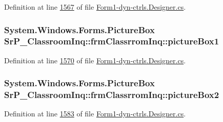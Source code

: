 \-Definition at line \hyperlink{_form1-dyn-ctrls_8_designer_8cs_source_l01567}{1567} of file \hyperlink{_form1-dyn-ctrls_8_designer_8cs_source}{\-Form1-\/dyn-\/ctrls.\-Designer.\-cs}.

\hypertarget{class_sr_p___classroom_inq_1_1frm_classrrom_inq_ab971146df86e1277868bef4199a7b8f4}{
\subsubsection[{picture\-Box1}]{\setlength{\rightskip}{0pt plus 5cm}\-System.\-Windows.\-Forms.\-Picture\-Box {\bf \-Sr\-P\-\_\-\-Classroom\-Inq\-::frm\-Classrrom\-Inq\-::picture\-Box1}}}
\label{class_sr_p___classroom_inq_1_1frm_classrrom_inq_ab971146df86e1277868bef4199a7b8f4}


\-Definition at line \hyperlink{_form1-dyn-ctrls_8_designer_8cs_source_l01570}{1570} of file \hyperlink{_form1-dyn-ctrls_8_designer_8cs_source}{\-Form1-\/dyn-\/ctrls.\-Designer.\-cs}.

\hypertarget{class_sr_p___classroom_inq_1_1frm_classrrom_inq_aeb268a5866f810521414bd3fd047ca72}{
\subsubsection[{picture\-Box2}]{\setlength{\rightskip}{0pt plus 5cm}\-System.\-Windows.\-Forms.\-Picture\-Box {\bf \-Sr\-P\-\_\-\-Classroom\-Inq\-::frm\-Classrrom\-Inq\-::picture\-Box2}}}
\label{class_sr_p___classroom_inq_1_1frm_classrrom_inq_aeb268a5866f810521414bd3fd047ca72}


\-Definition at line \hyperlink{_form1-dyn-ctrls_8_designer_8cs_source_l01583}{1583} of file \hyperlink{_form1-dyn-ctrls_8_designer_8cs_source}{\-Form1-\/dyn-\/ctrls.\-Designer.\-cs}.

